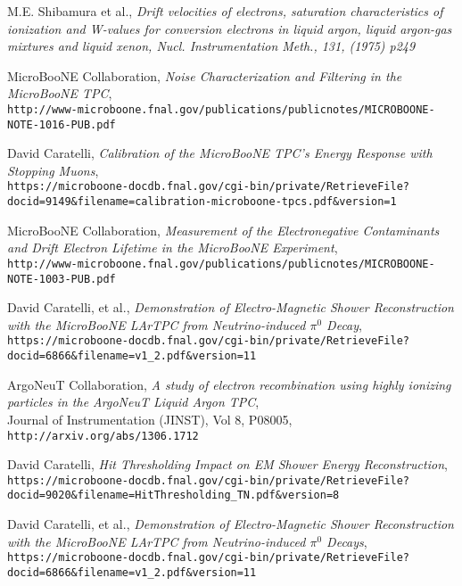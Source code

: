 \documentclass{article}
\begin{document}
\begin{thebibliography}{9}
 M.E. Shibamura et al., \emph{Drift velocities of electrons, saturation characteristics of ionization
and W-values for conversion electrons in liquid argon, liquid argon-gas mixtures and liquid
xenon, Nucl. Instrumentation Meth., 131, (1975) p249}

  MicroBooNE Collaboration, \emph{Noise Characterization and Filtering in the MicroBooNE TPC},\\
  \texttt{http://www-microboone.fnal.gov/publications/publicnotes/MICROBOONE-NOTE-1016-PUB.pdf}

  David Caratelli, \emph{Calibration of the MicroBooNE TPC’s Energy Response with Stopping Muons},\\
  \texttt{https://microboone-docdb.fnal.gov/cgi-bin/private/RetrieveFile?docid=9149\&filename=calibration-microboone-tpcs.pdf\&version=1}

  MicroBooNE Collaboration, \emph{Measurement of the Electronegative Contaminants and Drift Electron Lifetime in the MicroBooNE Experiment},\\
  \texttt{http://www-microboone.fnal.gov/publications/publicnotes/MICROBOONE-NOTE-1003-PUB.pdf}


  David Caratelli, et al., \emph{Demonstration of Electro-Magnetic Shower Reconstruction with the MicroBooNE LArTPC from Neutrino-induced $\pi^0$ Decay},\\
\texttt{https://microboone-docdb.fnal.gov/cgi-bin/private/RetrieveFile?docid=6866\&filename=v1\_2.pdf\&version=11}
  
  ArgoNeuT Collaboration, \emph{A study of electron recombination using highly ionizing particles in the ArgoNeuT Liquid Argon TPC},\\
  Journal of Instrumentation (JINST), Vol 8, P08005, \texttt{http://arxiv.org/abs/1306.1712}
  
  David Caratelli, \emph{Hit Thresholding Impact on EM Shower Energy Reconstruction},\\
  \texttt{https://microboone-docdb.fnal.gov/cgi-bin/private/RetrieveFile?docid=9020\&filename=HitThresholding\_TN.pdf\&version=8}

  David Caratelli, et al., \emph{Demonstration of Electro-Magnetic Shower Reconstruction with
the MicroBooNE LArTPC from Neutrino-induced $\pi^0$ Decays},\\
  \texttt{https://microboone-docdb.fnal.gov/cgi-bin/private/RetrieveFile?docid=6866\&filename=v1\_2.pdf\&version=11}
  

\end{thebibliography}
\end{document}
